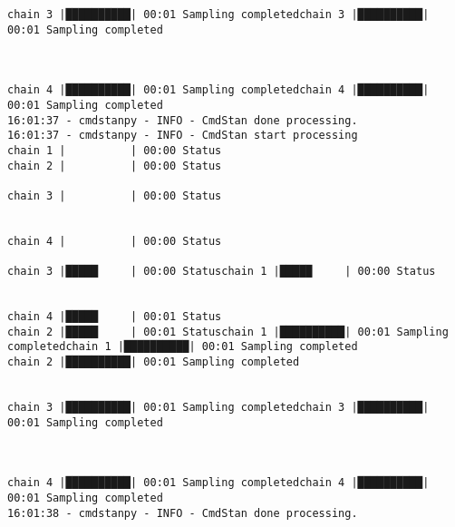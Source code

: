 \documentclass[
  letterpaper,
  DIV=11,
  numbers=noendperiod]{scrartcl}
\begin{document}
\begin{verbatim}
chain 3 |██████████| 00:01 Sampling completedchain 3 |██████████| 00:01 Sampling completed



chain 4 |██████████| 00:01 Sampling completedchain 4 |██████████| 00:01 Sampling completed
16:01:37 - cmdstanpy - INFO - CmdStan done processing.
16:01:37 - cmdstanpy - INFO - CmdStan start processing
chain 1 |          | 00:00 Status
chain 2 |          | 00:00 Status

chain 3 |          | 00:00 Status


chain 4 |          | 00:00 Status

chain 3 |█████     | 00:00 Statuschain 1 |█████     | 00:00 Status


chain 4 |█████     | 00:01 Status
chain 2 |█████     | 00:01 Statuschain 1 |██████████| 00:01 Sampling completedchain 1 |██████████| 00:01 Sampling completed
chain 2 |██████████| 00:01 Sampling completed


chain 3 |██████████| 00:01 Sampling completedchain 3 |██████████| 00:01 Sampling completed



chain 4 |██████████| 00:01 Sampling completedchain 4 |██████████| 00:01 Sampling completed
16:01:38 - cmdstanpy - INFO - CmdStan done processing.
\end{verbatim}

\begin{verbatim}
                                                                                                                                                                                                                                                                                                                                
                                                                                                                                                                                                                                                                                                                                
                                                                                                                                                                                                                                                                                                                                
                                                                                                                                                                                                                                                                                                                                
\end{verbatim}
\end{document}
